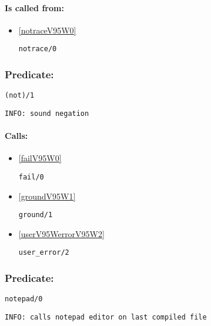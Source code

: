 \paragraph{Is called from:} 
\begin{itemize}
\item \ref{notraceV95W0} 
\begin{verbatim}
notrace/0
\end{verbatim}

\end{itemize}

\subsubsection{Predicate:} \label{notV95W1}

\begin{verbatim}
(not)/1
\end{verbatim}

{\small \begin{verbatim}
INFO: sound negation

\end{verbatim}}
\paragraph{Calls:} 
\begin{itemize}
\item \ref{failV95W0} 
\begin{verbatim}
fail/0
\end{verbatim}

\item \ref{groundV95W1} 
\begin{verbatim}
ground/1
\end{verbatim}

\item \ref{userV95WerrorV95W2} 
\begin{verbatim}
user_error/2
\end{verbatim}

\end{itemize}

\subsubsection{Predicate:} \label{notepadV95W0}

\begin{verbatim}
notepad/0
\end{verbatim}

{\small \begin{verbatim}
INFO: calls notepad editor on last compiled file

\end{verbatim}}

